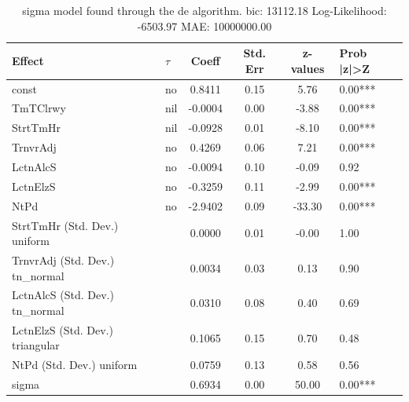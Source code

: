 \begin{table}
	\caption{sigma model found through the de algorithm. bic: 13112.18 Log-Likelihood: -6503.97 MAE: 10000000.00}
	\begin{center}
		\begin{tabular}{|l|l|c|c|c|l|}
			\hline
			Effect & $\tau$ & Coeff & Std. Err & z-values & Prob |z|>Z \\
			\hline
			const & no & 0.8411 & 0.15 & 5.76 & 0.00*** \\
			\hline
			TmTClrwy & nil & -0.0004 & 0.00 & -3.88 & 0.00*** \\
			\hline
			StrtTmHr & nil & -0.0928 & 0.01 & -8.10 & 0.00*** \\
			\hline
			TrnvrAdj & no & 0.4269 & 0.06 & 7.21 & 0.00*** \\
			\hline
			LctnAlcS & no & -0.0094 & 0.10 & -0.09 & 0.92 \\
			\hline
			LctnElzS & no & -0.3259 & 0.11 & -2.99 & 0.00*** \\
			\hline
			NtPd & no & -2.9402 & 0.09 & -33.30 & 0.00*** \\
			\hline
			StrtTmHr (Std. Dev.) uniform &  & 0.0000 & 0.01 & -0.00 & 1.00 \\
			\hline
			TrnvrAdj (Std. Dev.) tn_normal &  & 0.0034 & 0.03 & 0.13 & 0.90 \\
			\hline
			LctnAlcS (Std. Dev.) tn_normal &  & 0.0310 & 0.08 & 0.40 & 0.69 \\
			\hline
			LctnElzS (Std. Dev.) triangular &  & 0.1065 & 0.15 & 0.70 & 0.48 \\
			\hline
			NtPd (Std. Dev.) uniform &  & 0.0759 & 0.13 & 0.58 & 0.56 \\
			\hline
			sigma &  & 0.6934 & 0.00 & 50.00 & 0.00*** \\
			\hline
		\end{tabular}
	\end{center}
\end{table}